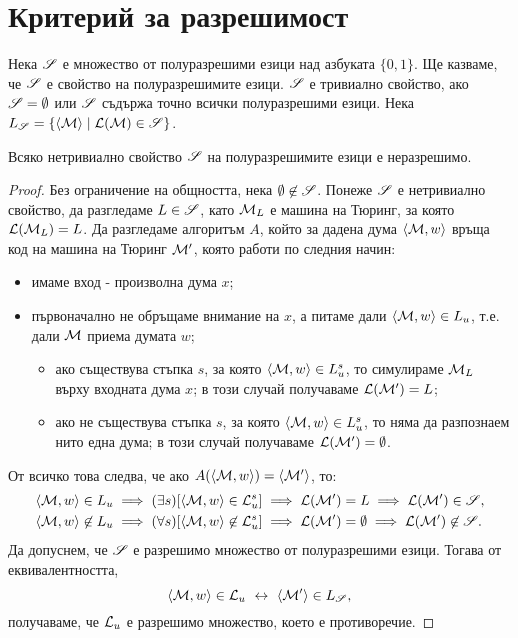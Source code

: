 \section{Критерий за разрешимост}

Нека $\mathscr{S}$ е множество от полуразрешими езици над азбуката $\{0,1\}$.
Ще казваме, че $\mathscr{S}$ е свойство на полуразрешимите езици.
$\mathscr{S}$ е тривиално свойство, ако $\mathscr{S} = \emptyset$ или $\mathscr{S}$ съдържа точно всички полуразрешими езици.
Нека $L_{\mathscr{S}} = \{\langle{\mathcal{M}}\rangle \mid \mathcal{L}(\mathcal{M}) \in \mathscr{S}\}$.

\begin{thm}
  Всяко нетривиално свойство $\mathscr{S}$ на полуразрешимите езици е неразрешимо.
\end{thm}
\begin{proof}
  Без ограничение на общността, нека $\emptyset \not\in \mathscr{S}$.
  Понеже $\mathscr{S}$ е нетривиално свойство, да разгледаме $L \in \mathscr{S}$,
  като $\mathcal{M}_L$ е машина на Тюринг, за която $\mathcal{L}(\mathcal{M}_L) = L$.
  Да разгледаме алгоритъм $A$, който за дадена дума $\langle{\mathcal{M},w}\rangle$
  връща код на машина на Тюринг $\mathcal{M}'$, която работи по следния начин:
  \begin{itemize}
  \item
    имаме вход - произволна дума $x$;
  \item
    първоначално не обръщаме внимание на $x$, а питаме дали $\langle{\mathcal{M},w}\rangle \in L_u$, т.е. дали $\mathcal{M}$ приема думата $w$;
    \begin{itemize}
    \item 
      ако съществува стъпка $s$, за която $\langle{\mathcal{M},w}\rangle \in L^s_u$, то симулираме $\mathcal{M}_L$ върху входната дума $x$;
      в този случай получаваме $\mathcal{L}(\mathcal{M}') = L$;
    \item
      ако не съществува стъпка $s$, за която $\langle{\mathcal{M},w}\rangle \in L^s_u$, то 
      няма да разпознаем нито една дума;
      в този случай получаваме $\mathcal{L}(\mathcal{M}') = \emptyset$.      
    \end{itemize}
  \end{itemize}
  От всичко това следва, че ако $A(\langle{\mathcal{M},w}\rangle) = \langle{\mathcal{M}'}\rangle$, то:
  \begin{align*}
    & \langle{\mathcal{M},w}\rangle \in L_u \implies (\exists s)[\langle{\mathcal{M},w}\rangle \in \mathcal{L}^s_u] \implies \mathcal{L}(\mathcal{M}') = L \implies \mathcal{L}(\mathcal{M}') \in \mathscr{S},\\
    & \langle{\mathcal{M},w}\rangle \not\in L_u \implies (\forall s)[\langle{\mathcal{M},w}\rangle \not\in \mathcal{L}^s_u] \implies \mathcal{L}(\mathcal{M}') = \emptyset \implies \mathcal{L}(\mathcal{M}') \not\in \mathscr{S}.
  \end{align*}
  Да допуснем, че $\mathscr{S}$ е разрешимо множество от полуразрешими езици.
  Тогава от еквивалентността,
  \[\langle{\mathcal{M},w}\rangle \in \mathcal{L}_u \ \leftrightarrow\  \langle{\mathcal{M}'}\rangle \in L_{\mathscr{S}},\]
  получаваме, че $\mathcal{L}_u$ е разрешимо множество, което е противоречие.
\end{proof}

